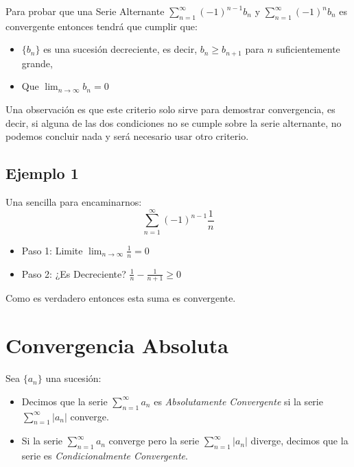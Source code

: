 \documentclass[12pt]{report}							    %
\begin{document}
    Para probar que una Serie Alternante $\sum_{n=1}^{\infty} (-1)^{n-1} b_n$ y $\sum_{n=1}^{\infty} (-1)^n b_n$ es convergente entonces tendrá que cumplir que:

    \begin{itemize}
        \item $\{b_n\}$ es una sucesión decreciente, es decir, $b_n \geq b_{n+1}$ para $n$ suficientemente grande, 
        \item Que $\lim_{n \to \infty} b_n = 0$
    \end{itemize}

    Una observación es que este criterio solo sirve para demostrar convergencia, es decir, si alguna de las dos condiciones no se cumple sobre la serie alternante, no podemos concluir nada y será necesario usar otro criterio.

    \subsection{Ejemplo 1}
    Una sencilla para encaminarnos:
    \begin{equation*}
        \sum_{n=1}^{\infty} (-1)^{n-1} \frac{1}{n}
    \end{equation*}


     \begin{itemize}
        \item Paso 1: Limite $\lim_{n \to \infty} \frac{1}{n}=0$
        \item Paso 2: ¿Es Decreciente? $\frac{1}{n}-\frac{1}{n+1} \geq 0 $
     \end{itemize}

    Como es verdadero entonces esta suma es convergente.





    \clearpage
    \section{Convergencia Absoluta}

    Sea $\{a_n\}$ una sucesión:

    \begin{itemize}
        \item Decimos que la serie $\sum_{n=1}^{\infty} a_n$ es \emph{Absolutamente Convergente} si la serie $\sum_{n=1}^{\infty} |a_n|$ converge.

        \item Si la serie $\sum_{n=1}^{\infty} a_n$ converge pero la serie $\sum_{n=1}^{\infty} |a_n|$ diverge, decimos que la serie es \emph{Condicionalmente Convergente}.
    \end{itemize}
\end{document}
